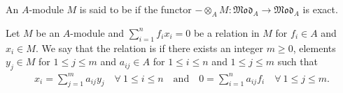 \begin{definition}
    An $A$-module $M$ is said to be  if the functor $-\otimes_A M: \mathfrak{Mod}_A\to\mathfrak{Mod}_A$ is exact.
\end{definition}

\begin{definition}
    Let $M$ be an $A$-module and $\sum_{i = 1}^n f_ix_i = 0$ be a relation in $M$ for $f_i\in A$ and $x_i\in M$. We say that the relation is  if there exists an integer $m\ge 0$, elements $y_j\in M$ for $1\le j\le m$ and $a_{ij}\in A$ for $1\le i\le n$ and $1\le j\le m$ such that 
    \begin{align*}
        x_i = \sum_{j = 1}^m a_{ij}y_j\quad\forall~1\le i\le n\quad\text{and}\quad 0 = \sum_{i = 1}^n a_{ij}f_i\quad\forall~1\le j\le m.
    \end{align*}
\end{definition}

